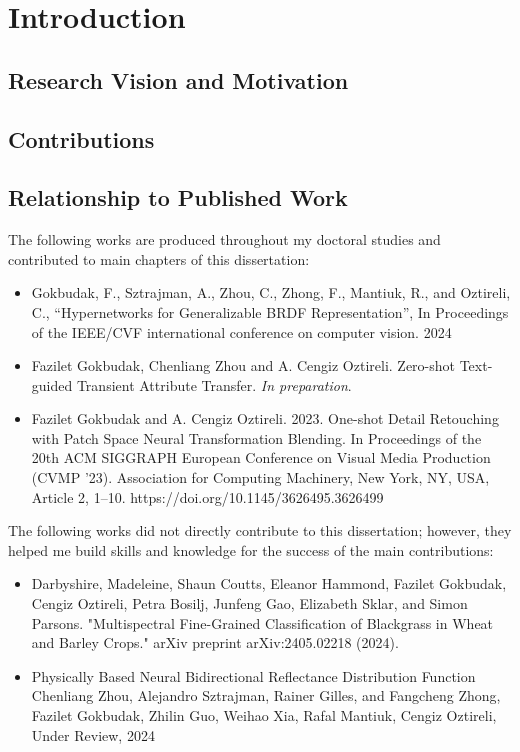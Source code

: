 \chapter{Introduction}






\section{Research Vision and Motivation}
\section{Contributions}
\section{Relationship to Published Work}

The following works are produced throughout my doctoral studies and contributed to main chapters of this dissertation:

\begin{itemize}

\item Gokbudak, F., Sztrajman, A., Zhou, C., Zhong, F., Mantiuk, R., and Oztireli, C., “Hypernetworks for Generalizable BRDF Representation”,  In Proceedings of the IEEE/CVF international conference on computer vision. 2024

\item Fazilet Gokbudak, Chenliang Zhou and A. Cengiz Oztireli. Zero-shot Text-guided Transient Attribute Transfer. \textit{In preparation}.

\item Fazilet Gokbudak and A. Cengiz Oztireli. 2023. One-shot Detail Retouching with Patch Space Neural Transformation Blending. In Proceedings of the 20th ACM SIGGRAPH European Conference on Visual Media Production (CVMP '23). Association for Computing Machinery, New York, NY, USA, Article 2, 1–10. https://doi.org/10.1145/3626495.3626499



\end{itemize}

The following works did not directly contribute to this dissertation; however, they helped me build skills and knowledge for the success of the main contributions:

\begin{itemize}

\item Darbyshire, Madeleine, Shaun Coutts, Eleanor Hammond, Fazilet Gokbudak, Cengiz Oztireli, Petra Bosilj, Junfeng Gao, Elizabeth Sklar, and Simon Parsons. "Multispectral Fine-Grained Classification of Blackgrass in Wheat and Barley Crops." arXiv preprint arXiv:2405.02218 (2024).

\item Physically Based Neural Bidirectional Reflectance Distribution Function
Chenliang Zhou, Alejandro Sztrajman, Rainer Gilles, and Fangcheng Zhong, Fazilet Gokbudak, Zhilin Guo, Weihao Xia, Rafal Mantiuk, Cengiz Oztireli, Under Review, 2024

\end{itemize}